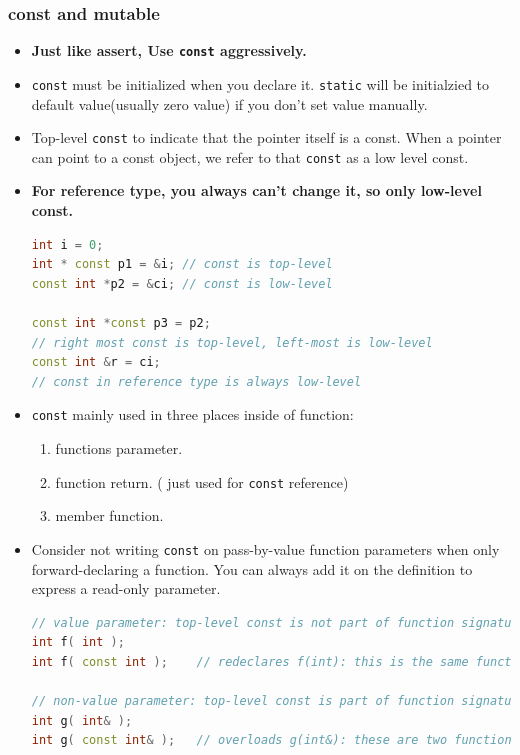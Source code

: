 \documentclass[a4paper,12pt,twoside]{book}
\begin{document}
\subsubsection{const and mutable}
\begin{itemize}
\item \textbf{Just like assert, Use \texttt{const} aggressively.}

\item \texttt{const} must be initialized when you declare it. \texttt{static} will be initialzied to default value(usually zero value) if you don't set value manually. 

\item Top-level \texttt{const} to indicate that the pointer itself is a const. When a pointer can point to a const object, we refer to that \texttt{const} as a low level const.

\item \textbf{For reference type, you always can't change it, so only low-level const.}
\begin{lstlisting}[frame=single, language=c++]
int i = 0;
int * const p1 = &i; // const is top-level
const int *p2 = &ci; // const is low-level

const int *const p3 = p2;
// right most const is top-level, left-most is low-level
const int &r = ci;
// const in reference type is always low-level
\end{lstlisting}


\item \texttt{const} mainly used in three places inside of function:
\begin{enumerate}
\item functions parameter.
\item function return. ( just used for \texttt{const} reference)
\item member function.
\end{enumerate}




\item  Consider not writing \texttt{const} on pass-by-value function parameters when only forward-declaring a function. You can always add it on the definition to express a read-only parameter.
\begin{lstlisting}[frame=single, language=c++]
// value parameter: top-level const is not part of function signature
int f( int );
int f( const int );    // redeclares f(int): this is the same function

// non-value parameter: top-level const is part of function signature
int g( int& );
int g( const int& );   // overloads g(int&): these are two functions
\end{lstlisting}


\end{itemize}
\end{document}
